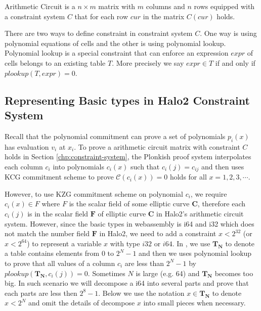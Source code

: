 \begin{definition}
Arithmetic Circuit is a $n \times m$ matrix with $m$ columns and $n$ rows equipped with a constraint system $C$ that for each row $cur$ in the matrix $C(cur)$ holds.
\end{definition}

There are two ways to define constraint in constraint system $C$. One way is using polynomial equations of cells and the other is using polynomial lookup. Polynomial lookup is a special constraint that can enforce an expression $expr$ of cells belongs to an existing table $T$. More precisely we say $expr \in T$ if and only if $plookup(T, expr) = 0$. 


\subsection{Representing Basic types in Halo2 Constraint System}
Recall that the polynomial commitment can prove a set of polynomials $p_i(x)$ has evaluation $v_i$ at $x_i$. To prove a arithmetic circuit matrix with constraint $C$ holds in Section \ref{chp:constraint-system}, the Plonkish proof system interpolates each column $c_i$ into polynomials $c_i(x)$ such that $c_i(j) = c_{ij}$ and then uses KCG commitment scheme to prove $\mathcal{C}(c_i(x)) = 0$ holds for all $x=1,2,3,\cdots$. 

However, to use KZG commitment scheme on polynomial $c_i$, we require $c_i(x) \in F$ where $F$ is the scalar field of some elliptic curve $\mathbf{C}$, therefore each $c_i(j)$ is in the scalar field $\mathbf{F}$ of elliptic curve $\mathbf{C}$ in Halo2's arithmetic circuit system. However, since the basic types in webassembly is i64 and i32 which does not match the number field $\mathbf{F}$ in Halo2, we need to add a constraint $x<2^{32}$ (or $x< 2^{64}$) to represent a variable $x$ with type $i32$ or $i64$. In \zkwasm, we use $\mathbf{T_N}$ to denote a table contains elements from $0$ to $2^N-1$ and then we uses polynomial lookup to prove that all values of a column $c_i$ are less than $2^N-1$ by $plookup(\mathbf{T_N}, c_i(j)) = 0$. Sometimes $N$ is large (e.g. 64) and $\mathbf{T_N}$ becomes too big. In such scenario we will decompose a i64 into several parts and prove that each parts are less then $2^8-1$. Below we use the notation $x \in \mathbf{T_N}$ to denote $x < 2^N$ and omit the details of decompose $x$ into small pieces when necessary.

